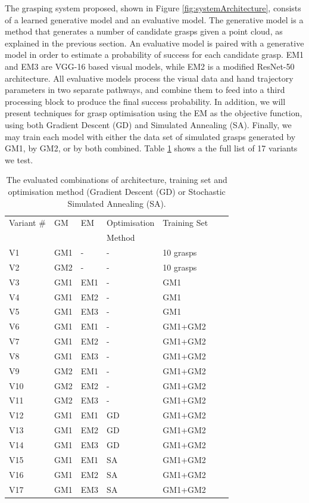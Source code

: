 The grasping system proposed, shown in Figure \ref{fig:systemArchitecture}, consists of a learned generative model and an evaluative model. The generative model is a method that generates a number of candidate grasps given a point cloud, as explained in the previous section. An evaluative model is paired with a generative model in order to estimate a probability of success for each candidate grasp. EM1 and EM3 are VGG-16 based visual models, while EM2 is a modified ResNet-50 architecture. All evaluative models process the visual data and hand trajectory parameters in two separate pathways, and combine them to feed into a third processing block to produce the final success probability. In addition, we will present techniques for grasp optimisation using the EM as the objective function, using both Gradient Descent (GD) and Simulated Annealing (SA). Finally, we may train each model with either the data set of simulated grasps generated by GM1, by GM2, or by both combined. Table \ref{table:GEBreakdown} shows a the full list of 17 variants we test.

\begin{table}[]
\centering
\begin{tabular}{|l|l|l|l|l|l|l|}
\hline
Variant \# & GM  & EM & Optimisation  & Training Set \\ 
 & & & Method & \\ \hline
V1 & GM1    & - & - & 10 grasps  \\ \hline
V2 & GM2    & - & - & 10 grasps  \\ \hline
V3 & GM1 & EM1 & - & GM1 \\ \hline
V4 & GM1 & EM2 & - & GM1 \\ \hline
V5 & GM1 & EM3 & - & GM1 \\ \hline
V6 & GM1 & EM1 & - & GM1+GM2 \\ \hline
V7 & GM1 & EM2 & - & GM1+GM2 \\ \hline
V8 & GM1 & EM3 & - & GM1+GM2 \\ \hline
V9 & GM2 & EM1 & - & GM1+GM2 \\ \hline
V10 & GM2 & EM2 & - & GM1+GM2 \\ \hline
V11 & GM2 & EM3 & - & GM1+GM2 \\ \hline
V12 & GM1 & EM1 & GD & GM1+GM2 \\ \hline
V13 & GM1 & EM2 & GD & GM1+GM2 \\ \hline
V14 & GM1 & EM3 & GD & GM1+GM2 \\ \hline
V15 & GM1 & EM1 & SA & GM1+GM2 \\ \hline
V16 & GM1 & EM2 & SA & GM1+GM2 \\ \hline
V17 & GM1 & EM3 & SA & GM1+GM2 \\ \hline
\end{tabular}
\caption{The evaluated combinations of architecture, training set and optimisation method (Gradient Descent (GD) or Stochastic Simulated Annealing (SA).}
\label{table:GEBreakdown}
\end{table}

